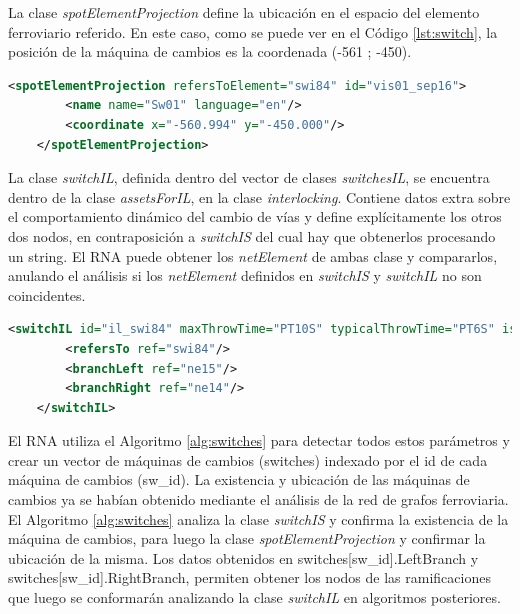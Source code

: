    La clase \textit{spotElementProjection} define la ubicación en el espacio del elemento ferroviario referido. En este caso, como se puede ver en el Código \ref{lst:switch}, la posición de la máquina de cambios es la coordenada (-561 ; -450).

    \begin{lstlisting}[language = XML, caption = Clase \textit{spotElementProjection} , label = {lst:switch}]
    <spotElementProjection refersToElement="swi84" id="vis01_sep16">
        <name name="Sw01" language="en"/>
        <coordinate x="-560.994" y="-450.000"/>
    </spotElementProjection>
    \end{lstlisting}

    La clase \textit{switchIL}, definida dentro del vector de clases \textit{switchesIL}, se encuentra dentro de la clase \textit{assetsForIL}, en la clase \textit{interlocking}. Contiene datos extra sobre el comportamiento dinámico del cambio de vías y define explícitamente los otros dos nodos, en contraposición a \textit{switchIS} del cual hay que obtenerlos procesando un string. El RNA puede obtener los \textit{netElement} de ambas clase y compararlos, anulando el análisis si los \textit{netElement} definidos en \textit{switchIS} y \textit{switchIL} no son coincidentes.
    
    \begin{lstlisting}[language = XML, caption = Clase \textit{SwitchIL} , label = {lst:switchIL}]
    <switchIL id="il_swi84" maxThrowTime="PT10S" typicalThrowTime="PT6S" isKeyLocked="false" returnsToPreferredPosition="false">
        <refersTo ref="swi84"/>
        <branchLeft ref="ne15"/>
        <branchRight ref="ne14"/>
    </switchIL>
    \end{lstlisting}
    
    El RNA utiliza el Algoritmo \ref{alg:switches} para detectar todos estos parámetros y crear un vector de máquinas de cambios (switches) indexado por el id de cada máquina de cambios (sw\_id). La existencia y ubicación de las máquinas de cambios ya se habían obtenido mediante el análisis de la red de grafos ferroviaria. El Algoritmo \ref{alg:switches} analiza la clase \textit{switchIS} y confirma la existencia de la máquina de cambios, para luego la clase \textit{spotElementProjection} y confirmar la ubicación de la misma. Los datos obtenidos en switches[sw\_id].LeftBranch y switches[sw\_id].RightBranch, permiten obtener los nodos de las ramificaciones que luego se conformarán analizando la clase \textit{switchIL} en algoritmos posteriores.

